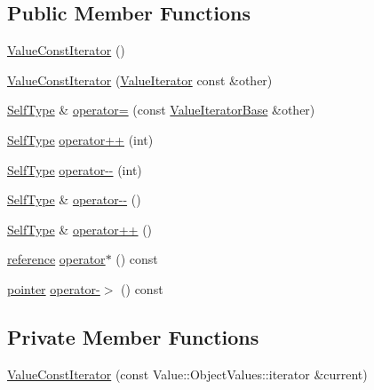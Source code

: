 \subsection*{Public Member Functions}
\begin{DoxyCompactItemize}
\item 
\hyperlink{class_json_1_1_value_const_iterator_a1b10a46f1606421b0663492a5f9a2aad}{Value\+Const\+Iterator} ()
\item 
\hyperlink{class_json_1_1_value_const_iterator_a7ef3df204a9ae83a0d8a3cd128e05c70}{Value\+Const\+Iterator} (\hyperlink{class_json_1_1_value_iterator}{Value\+Iterator} const \&other)
\item 
\hyperlink{class_json_1_1_value_iterator_base_a9d2a940d03ea06d20d972f41a89149ee}{Self\+Type} \& \hyperlink{class_json_1_1_value_const_iterator_ad1b1c11f8d7fb22d4d3c231915f2b15b}{operator=} (const \hyperlink{class_json_1_1_value_iterator_base}{Value\+Iterator\+Base} \&other)
\item 
\hyperlink{class_json_1_1_value_iterator_base_a9d2a940d03ea06d20d972f41a89149ee}{Self\+Type} \hyperlink{class_json_1_1_value_const_iterator_ab3f0c2edbfc8f7d60645f3d597d05e28}{operator++} (int)
\item 
\hyperlink{class_json_1_1_value_iterator_base_a9d2a940d03ea06d20d972f41a89149ee}{Self\+Type} \hyperlink{class_json_1_1_value_const_iterator_a94935961e9331c6f7b907b05ec8df75e}{operator-\/-\/} (int)
\item 
\hyperlink{class_json_1_1_value_iterator_base_a9d2a940d03ea06d20d972f41a89149ee}{Self\+Type} \& \hyperlink{class_json_1_1_value_const_iterator_a31415e44e44e56fb2bfda7e8bb784646}{operator-\/-\/} ()
\item 
\hyperlink{class_json_1_1_value_iterator_base_a9d2a940d03ea06d20d972f41a89149ee}{Self\+Type} \& \hyperlink{class_json_1_1_value_const_iterator_a2cfe2f7a94a688186efdafb1b181c319}{operator++} ()
\item 
\hyperlink{class_json_1_1_value_const_iterator_aa9b05c6a37cd352ea1ee6e13b816f709}{reference} \hyperlink{class_json_1_1_value_const_iterator_ae5612dad47a6387eef71d584fb741d0c}{operator$\ast$} () const
\item 
\hyperlink{class_json_1_1_value_const_iterator_a400136bd8bc09e9fddec0785fa2cff14}{pointer} \hyperlink{class_json_1_1_value_const_iterator_a3c608ae53c192ee846eb265bae1cfeec}{operator-\/$>$} () const
\end{DoxyCompactItemize}
\subsection*{Private Member Functions}
\begin{DoxyCompactItemize}
\item 
\hyperlink{class_json_1_1_value_const_iterator_aa0a87edf5f1097f91dca5f2a389c4abd}{Value\+Const\+Iterator} (const Value\+::\+Object\+Values\+::iterator \&current)
\end{DoxyCompactItemize}
